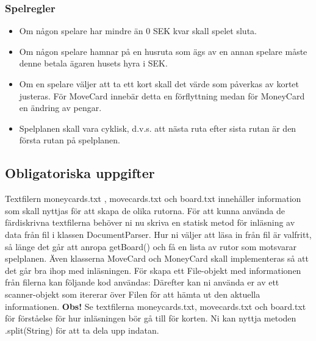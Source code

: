 \subsubsection{Spelregler}

\begin{itemize}
\item Om någon spelare har mindre än 0 SEK kvar skall spelet sluta.
\item Om någon spelare hamnar på en husruta som ägs av en annan spelare måste denne betala ägaren husets hyra i SEK.
\item Om en spelare väljer att ta ett kort skall det värde som påverkas av kortet justeras. För MoveCard innebär detta en förflyttning medan för MoneyCard en ändring av pengar.
\item Spelplanen skall vara cyklisk, d.v.s. att nästa ruta efter sista rutan är den första rutan på spelplanen.
\end{itemize}



\subsection{Obligatoriska uppgifter}

\Task Textfilern moneycards.txt , movecards.txt och board.txt innehåller information som skall nyttjas för att skapa de olika rutorna. För att kunna använda de färdiskrivna textfilerna behöver ni nu skriva en statisk metod för inläsning av data från fil i klassen DocumentParser. Hur ni väljer att läsa in från fil är valfritt,  så länge det går att anropa getBoard() och få en lista av rutor som motsvarar spelplanen. Även klasserna MoveCard och MoneyCard skall implementeras så att det går bra ihop med inläsningen.
För skapa ett File-objekt med informationen från filerna kan följande kod användas:
\newline
\newline
{}
\newline
{}
\newline
\newline
Därefter kan ni använda er av ett scanner-objekt som itererar över Filen för att hämta ut den aktuella informationen.
\noindent
\textbf{Obs!} Se textfilerna moneycards.txt, movecards.txt och board.txt för förståelse för hur inläsningen bör gå till för korten.  Ni kan nyttja metoden .split(String) för att ta dela upp indatan.

